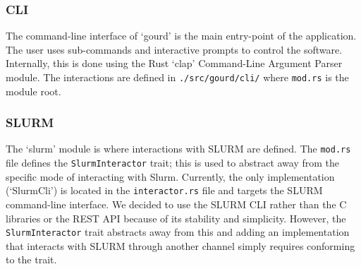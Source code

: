 \subsubsection{CLI}
The command-line interface of `gourd' is the main entry-point of the
application.
The user uses sub-commands and interactive prompts to control
the software.
Internally, this is done using the Rust `clap' Command-Line
Argument Parser module.
The interactions are defined in
\verb|./src/gourd/cli/| where \verb|mod.rs| is the module root.

\subsubsection{SLURM}

The `slurm' module is where interactions with SLURM are defined.
The \verb|mod.rs| file defines the \verb|SlurmInteractor| trait;
this is used to abstract away from the specific mode of interacting
with Slurm.
Currently, the only implementation (`SlurmCli') is located in the
\verb|interactor.rs| file and targets the SLURM command-line interface.
We decided to use the SLURM CLI rather than the C libraries or
the REST API because of its stability and simplicity.
However, the \verb|SlurmInteractor| trait abstracts away from this and
adding an implementation that interacts with SLURM through another
channel simply requires conforming to the trait.
